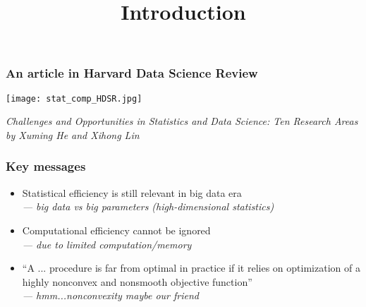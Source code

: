 \documentclass[compress,
mathserif,wide,%
]{beamer}
\title %
{ Introduction}
\begin{document}
\begin{frame}[plain]
  \titlepage

\end{frame}

\begin{frame}
	\frametitle{An article in Harvard Data Science Review}

	\begin{center}
\texttt{[image: stat\_comp\_HDSR.jpg]}

\end{center}	
	{\scriptsize  \em \hfill  Challenges and Opportunities in Statistics and Data Science: Ten Research Areas \\
	\hfill by Xuming He and Xihong Lin}
\end{frame}

\begin{frame}
	\frametitle{Key messages}
	\begin{itemize}
		\item Statistical efficiency is still relevant in big data era \\\pause
			{\hfill \em --- big data vs big parameters (high-dimensional statistics)} \\ \pause
		\item Computational efficiency cannot be ignored  \\ \pause
			{\hfill \em --- due to limited computation/memory} \pause
		\item {\small ``A ... procedure is far from optimal in practice if it relies on optimization  of a highly nonconvex and nonsmooth objective function''} \\ \pause
			{\hfill \em --- hmm...nonconvexity maybe our friend}
	\end{itemize}
\end{frame}
\end{document}
